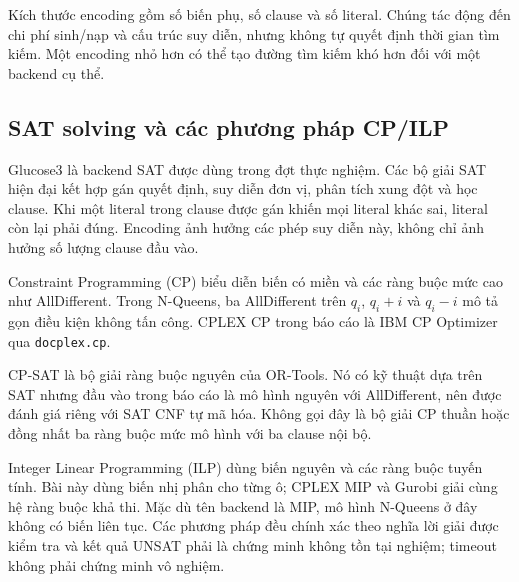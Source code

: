 Kích thước encoding gồm số biến phụ, số clause và số literal. Chúng tác động đến chi phí sinh/nạp và cấu trúc suy diễn, nhưng không tự quyết định thời gian tìm kiếm. Một encoding nhỏ hơn có thể tạo đường tìm kiếm khó hơn đối với một backend cụ thể.

\subsection{SAT solving và các phương pháp CP/ILP}
Glucose3 là backend SAT được dùng trong đợt thực nghiệm. Các bộ giải SAT hiện đại kết hợp gán quyết định, suy diễn đơn vị, phân tích xung đột và học clause. Khi một literal trong clause được gán khiến mọi literal khác sai, literal còn lại phải đúng. Encoding ảnh hưởng các phép suy diễn này, không chỉ ảnh hưởng số lượng clause đầu vào.

Constraint Programming (CP) biểu diễn biến có miền và các ràng buộc mức cao như AllDifferent. Trong N-Queens, ba AllDifferent trên $q_i$, $q_i+i$ và $q_i-i$ mô tả gọn điều kiện không tấn công. CPLEX CP trong báo cáo là IBM CP Optimizer qua \texttt{docplex.cp}.

CP-SAT là bộ giải ràng buộc nguyên của OR-Tools. Nó có kỹ thuật dựa trên SAT nhưng đầu vào trong báo cáo là mô hình nguyên với AllDifferent, nên được đánh giá riêng với SAT CNF tự mã hóa. Không gọi đây là bộ giải CP thuần hoặc đồng nhất ba ràng buộc mức mô hình với ba clause nội bộ.

Integer Linear Programming (ILP) dùng biến nguyên và các ràng buộc tuyến tính. Bài này dùng biến nhị phân cho từng ô; CPLEX MIP và Gurobi giải cùng hệ ràng buộc khả thi. Mặc dù tên backend là MIP, mô hình N-Queens ở đây không có biến liên tục. Các phương pháp đều chính xác theo nghĩa lời giải được kiểm tra và kết quả UNSAT phải là chứng minh không tồn tại nghiệm; timeout không phải chứng minh vô nghiệm.
